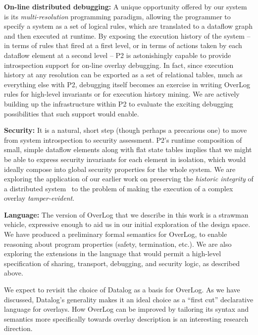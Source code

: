 \documentclass{sig-alt-full}
\def\Sys{P2\xspace}
\def\Lang{OverLog\xspace}
\begin{document}
{\bf On-line distributed debugging:} A unique
opportunity offered by our system is its
\emph{multi-resolution} programming paradigm, allowing
the programmer to specify a system as a set of
logical rules, which are translated to a dataflow
graph and then executed at runtime.  By
exposing the execution history of the system -- in
terms of rules that fired at a first level, or in
terms of actions taken by each dataflow element at
a second level -- \Sys is astonishingly capable to
provide introspection support for on-line overlay
debugging.  In fact, since execution history at any
resolution can be exported as a set of relational
tables, much as everything else with \Sys,
debugging itself becomes an exercise in writing
\Lang rules for high-level invariants or for
execution history mining.  We are actively building
up the infrastructure within \Sys to 
evaluate the exciting debugging possibilities
that such support would enable.


{\bf Security:} It is a natural, short step (though perhaps
a precarious one) to move from system introspection
to security assessment.  \Sys's runtime composition
of small, simple dataflow elements along
with flat state tables implies that we might be
able to express security invariants for each
element in isolation, which would ideally compose
into global security properties for the whole
system.  We are exploring the application of our earlier work
on preserving the \emph{historic integrity} of a
distributed system~\cite{Maniatis2003thesis} to the
problem of making the execution of a complex
overlay \emph{tamper-evident}.


{\bf Language:} The version of \Lang that we
describe in this work is a strawman vehicle,
expressive enough to aid us in our initial exploration of
the design space.  We have produced a preliminary
formal semantics for \Lang, to enable reasoning
about program properties (safety, termination,
etc.).  We are also exploring the extensions in the
language that would permit a high-level
specification of sharing, transport, debugging, and security
logic, as described above.

We expect to revisit the choice of Datalog as a
basis for \Lang.  As we have discussed, Datalog's
generality makes it an ideal choice as a ``first
cut'' declarative language for overlays.  How \Lang
can be improved by tailoring its syntax and
semantics more specifically towards overlay
description is an interesting research direction.
\end{document}
